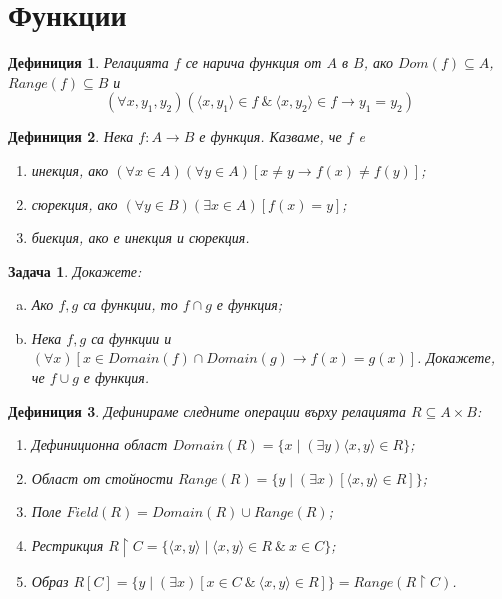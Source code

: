\documentclass[a4paper]{article}
\newtheorem{dfn}{Дефиниция}
\newtheorem{problem}{Задача}
\begin{document}
\author{Stefan Vatev}


\section{Функции}


\begin{dfn}
  Релацията $f$ се нарича функция от $A$ в $B$, ако
  $Dom(f)\subseteq A$, $Range(f)\subseteq B$ и 
  \[(\forall x,y_1,y_2)(\langle{x,y_1}\rangle\in f\ \&\ \langle{x,y_2}\rangle\in f \rightarrow y_1 = y_2)\]
\end{dfn}


\begin{dfn}
  Нека $f:A\rightarrow B$ е функция. Казваме, че $f$ e
  \begin{enumerate}
    \item
      инекция, ако $(\forall x\in A)(\forall y\in A)[x\neq y \rightarrow f(x)\neq f(y)]$;
    \item
      сюрекция, ако $(\forall y\in B)(\exists x\in A)[f(x) = y]$;
    \item
      биекция, ако е инекция и сюрекция.
  \end{enumerate}
\end{dfn}


\begin{problem}
  Докажете:
  \begin{enumerate}[a)]
  \item
    Ако $f,g$ са функции, то $f\cap g$ е функция;
  \item
    Нека $f,g$ са функции и $(\forall x)[x\in Domain(f)\cap Domain(g)\rightarrow f(x) = g(x)]$.
    Докажете, че $f\cup g$ е функция.
  \end{enumerate}
\end{problem}


\begin{dfn}
  Дефинираме следните операции върху релацията $R\subseteq A\times{B}$:
  \begin{enumerate}
  \item
    Дефиниционна област
    $Domain(R) = \{x\mid (\exists y)\langle{x,y}\rangle\in R \}$;
  \item
    Област от стойности
    $Range(R) = \{y\mid (\exists x)[\langle{x,y}\rangle\in R]\}$;
  \item
    Поле
    $Field(R) = Domain(R) \cup Range(R)$;
  \item
    Рестрикция
    $R\upharpoonright{C} = \{\langle{x,y}\rangle\mid \langle{x,y}\rangle\in R\ \&\ x\in C\}$;
  \item
    Образ
    $R[C] = \{ y \mid (\exists x)[ x\in C\ \&\ \langle{x,y}\rangle\in R]\} = Range(R\upharpoonright{C})$.


\end{enumerate}
\end{dfn}
\end{document}
